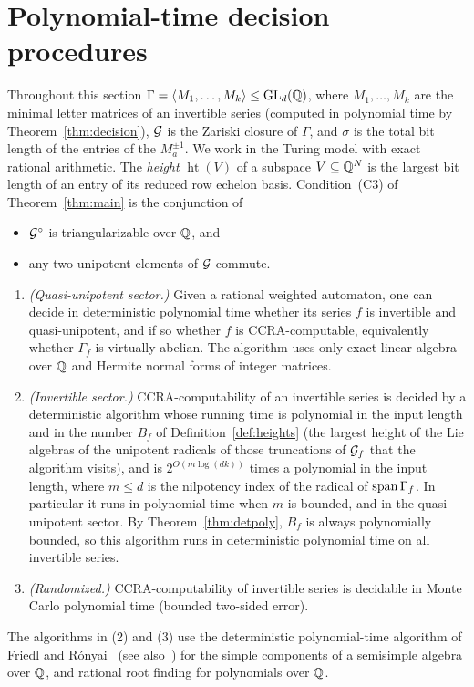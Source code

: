 \section{Polynomial-time decision procedures}\label{sec:polytime}

Throughout this section $\Gamma=\langle M_1,\ldots,M_k\rangle\le\mathrm{GL}_d(\mathbb{Q})$, where
$M_1,\ldots,M_k$ are the minimal letter matrices of an invertible series (computed in
polynomial time by Theorem~\ref{thm:decision}), $\mathcal{G}$ is the Zariski closure of $\Gamma$, and
$\sigma$ is the total bit length of the entries of the $M_a^{\pm1}$. We work in the Turing model
with exact rational arithmetic. The \emph{height} $\operatorname{ht}(V)$ of a subspace
$V\subseteq\mathbb{Q}^N$ is the largest bit length of an entry of its reduced row echelon basis.
Condition~(C3) of Theorem~\ref{thm:main} is the conjunction of
\begin{itemize}
\item[(a)] $\mathcal{G}^\circ$ is triangularizable over $\mathbb{Q}$, and
\item[(b)] any two unipotent elements of $\mathcal{G}$ commute.
\end{itemize}

\begin{theorem}\label{thm:polytime}
\begin{enumerate}
\item \emph{(Quasi-unipotent sector.)} Given a rational weighted automaton, one can decide in
deterministic polynomial time whether its series $f$ is invertible and quasi-unipotent, and if
so whether $f$ is CCRA-computable, equivalently whether $\Gamma_f$ is virtually abelian. The
algorithm uses only exact linear algebra over $\mathbb{Q}$ and Hermite normal forms of integer matrices.
\item \emph{(Invertible sector.)} CCRA-computability of an invertible series is decided by a
deterministic algorithm whose running time is polynomial in the input length and in the number
$B_f$ of Definition~\ref{def:heights} (the largest height of the Lie algebras of the unipotent
radicals of those truncations of $\mathcal{G}_f$ that the algorithm visits), and is $2^{O(m\log(dk))}$ times a polynomial in the input
length, where $m\le d$ is the nilpotency index of the radical of $\operatorname{span}\Gamma_f$. In
particular it runs in polynomial time when $m$ is bounded, and in the quasi-unipotent sector. By
Theorem~\ref{thm:detpoly}, $B_f$ is always polynomially bounded, so this algorithm runs in
deterministic polynomial time on all invertible series.
\item \emph{(Randomized.)} CCRA-computability of invertible series is decidable in Monte Carlo
polynomial time (bounded two-sided error).
\end{enumerate}
The algorithms in (2) and (3) use the deterministic polynomial-time algorithm of Friedl and
R\'onyai~\cite{FR85} (see also~\cite[Theorem~2.6]{Bea99}) for the simple components of a
semisimple algebra over $\mathbb{Q}$, and rational root finding for polynomials over $\mathbb{Q}$.
\end{theorem}

